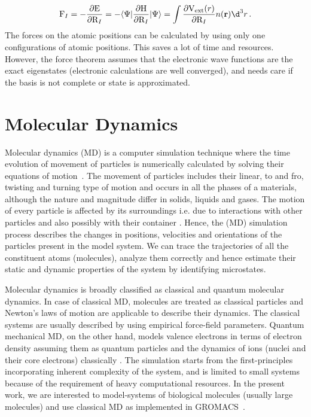 \begin{eqnarray}
 {\rm F}_I = - \frac{\partial {\rm E} }{\partial {\rm R}_I} = - \langle\Psi|\frac{\partial {\rm H}}{\partial {\rm R}_I} | \Psi\rangle  
 = \int \frac{\partial {\rm V}_{\rm ext}(r)}{\partial {\rm R}_I } n({\bf r})\d^3r\, .
\end{eqnarray}
The forces on the atomic positions can be calculated by using only one configurations of atomic positions. This saves a lot of time  and resources. However, the force theorem assumes that the electronic wave functions are the exact eigenstates (electronic calculations are well converged), and needs care if the basis is not complete or state is approximated. 
\section{Molecular Dynamics}
Molecular dynamics (MD) is a computer simulation technique where the time evolution of movement of particles 
is numerically calculated by solving their equations of motion~\citep{Allen1989, Frenkel2002}. The movement of particles includes their linear, to and fro, twisting and turning type of motion and occurs in all the phases of a materials, although the nature and magnitude differ in solids, liquids and gases. The motion of every particle is affected by its surroundings i.e. due to interactions with other particles and also possibly with their container \citep{Haile1992}. Hence, the (MD) simulation process describes the changes in positions, velocities and orientations of the particles present in the model system. We can trace the trajectories of all the constituent atoms (molecules), analyze them correctly and hence estimate their static and dynamic properties of the  system by identifying microstates. 

Molecular dynamics is broadly classified as classical and quantum molecular dynamics. In case of classical MD, molecules are treated as classical particles and Newton's laws of motion are applicable to describe their dynamics. The classical systems are usually described by using empirical force-field parameters. Quantum mechanical MD, on the other hand, models valence electrons in terms of electron density assuming them as quantum particles and the dynamics of ions (nuclei and their core electrons) classically \citep{Car1985, Marx2009, Barnett1993}. The simulation starts from the first-principles incorporating inherent complexity of the system, and is limited to small systems because of the requirement of heavy computational resources. In the present work, we are interested to model-systems of biological molecules (usually large molecules) and use classical MD as implemented in GROMACS~\citep{Gromacs-manual}.

